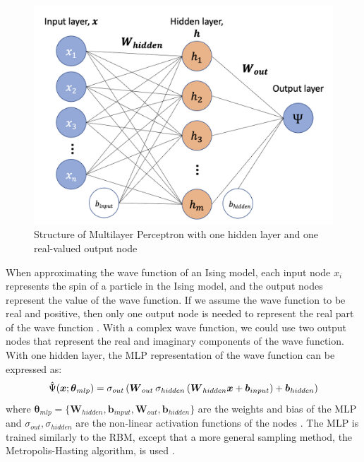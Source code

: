 \begin{figure}[h!]
    \centering
    \includegraphics[width=0.7\linewidth]{images/mlp_diagram.png}
    \caption{Structure of Multilayer Perceptron with one hidden layer and one real-valued output node}
    \label{rbmstructure}
\end{figure}
When approximating the wave function of an Ising model, each input node $x_i$ represents the spin of a particle in the Ising model, and the output nodes represent the value of the wave function. If we assume the wave function to be real and positive, then only one output node is needed to represent the real part of the wave function \cite{b20}. With a complex wave function, we could use two output nodes that represent the real and imaginary components of the wave function. With one hidden layer, the MLP representation of the wave function can be expressed as:
\begin{equation}
    \Hat{\Psi}(\boldsymbol{x}; \boldsymbol{\theta}_{mlp}) = 
    \sigma_{out} \left(
    \boldsymbol{W}_{out} \hspace{2px}
    \sigma_{hidden} \left( \boldsymbol{W}_{hidden}\boldsymbol{x} + \boldsymbol{b}_{input} \right) + \boldsymbol{b}_{hidden} \right)
\end{equation}
where  $\boldsymbol{\theta}_{mlp} = \{\boldsymbol{W}_{hidden}, \boldsymbol{b}_{input}, \boldsymbol{W}_{out}, \boldsymbol{b}_{hidden}\}$ are the weights and bias of the MLP and $\sigma_{out}, \sigma_{hidden}$ are the non-linear activation functions of the nodes \cite{b20}. The MLP is trained similarly to the RBM, except that a more general sampling method, the Metropolis-Hasting algorithm, is used \cite{b25}.

